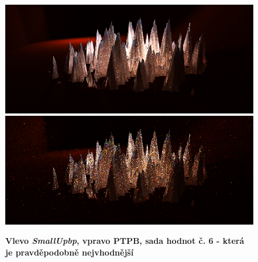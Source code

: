 \begin{figure}[H]\centering
\includegraphics[width=0.5\linewidth]{obrazky-figures/test-smallupbp-6-3h.png}\hfill
\includegraphics[width=0.5\linewidth]{obrazky-figures/PTPB_1800.png}\hfill
  \caption{\textbf{Vlevo \textit{SmallUpbp}, vpravo PTPB, sada hodnot č. 6 - která je pravděpodobně nejvhodnější}}
  \label{mereni-6}
\end{figure}

